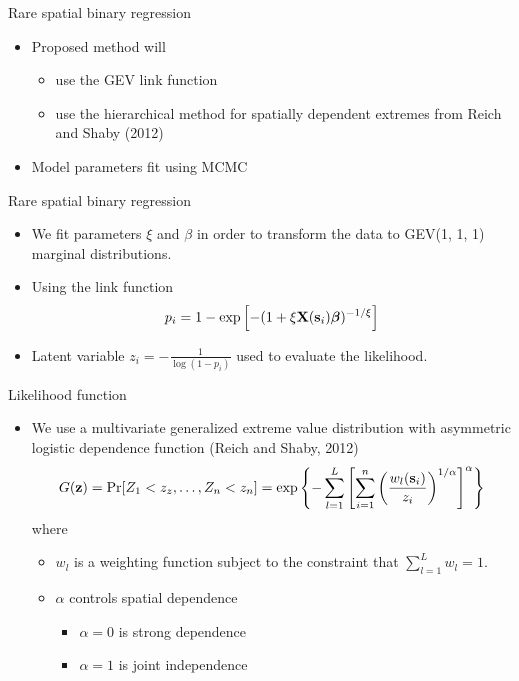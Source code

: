\documentclass{beamer}
\begin{document}
\begin{frame}{Rare spatial binary regression}
  \begin{itemize} \setlength{\itemsep}{0.5em}
    \item Proposed method will
    \begin{itemize}
      \item use the GEV link function
      \item use the hierarchical method for spatially dependent extremes from Reich and Shaby (2012)
    \end{itemize}
    \item Model parameters fit using MCMC
  \end{itemize}
\end{frame}

\begin{frame}{Rare spatial binary regression}
  \begin{itemize} \setlength{\itemsep}{0.5em}
    \item We fit parameters $\xi$ and $\beta$ in order to transform the data to GEV(1, 1, 1) marginal distributions.
    \item Using the link function
    \begin{align*}
      p_i = 1 - \exp \left[-(1 + \xi \mbox{\bf X}(\mbox{\bf s}_i) \mbox{\boldmath $\beta$})^{-1/\xi}\right]
    \end{align*}
    \item Latent variable $z_i = -\frac{1}{\log(1 - p_i)}$ used to evaluate the likelihood.
  \end{itemize}
\end{frame}

\begin{frame}{Likelihood function}
  \begin{itemize} \setlength{\itemsep}{0.5em}
    \item We use a multivariate generalized extreme value distribution with asymmetric logistic dependence function (Reich and Shaby, 2012)
    \footnotesize{
    \begin{align*}
      G(\mbox{\bf z}) = \Pr[Z_1 < z_z, \ldots, Z_n < z_n] = \exp\left\{ - \sum_{l = 1}^{L} \left[ \sum_{i = 1}^n \left( \frac{ w_l(\mbox{\bf s}_i) }{ z_i } \right)^{ 1 / \alpha} \right]^\alpha \right\}
    \end{align*}
    }
    where
    \begin{itemize}
      \item $w_l$ is a weighting function subject to the constraint that $\sum_{l = 1}^L w_l = 1$.
      \item $\alpha$ controls spatial dependence
      \begin{itemize}
        \item $\alpha = 0$ is strong dependence
        \item $\alpha = 1$ is joint independence
      \end{itemize}
    \end{itemize}
  \end{itemize}
\end{frame}
\end{document}
